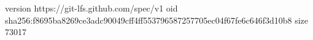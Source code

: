 version https://git-lfs.github.com/spec/v1
oid sha256:f8695ba8269ce3adc90049cff4ff553796587257705ec04f67fe6c646f3d10b8
size 73017
